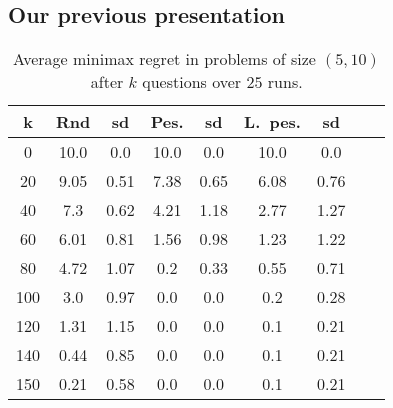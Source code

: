 \documentclass[sigconf, anonymous]{aamas}
\begin{document}
\subsection{Our previous presentation}
\begin{table}
	\begin{center}
		\begin{tabular}{S[table-figures-integer=3, table-number-alignment = right, table-figures-decimal=0]S[table-number-alignment = right]@{ ± }S[table-number-alignment = left]S[table-number-alignment = right]@{ ± }S[table-number-alignment = left]S[table-number-alignment = right]@{ ± }S[table-number-alignment = left]S[table-number-alignment = right]@{ ± }S[table-number-alignment = left]}
			\toprule
			{k} & {Rnd} & {sd} & {Pes.} & {sd} & {L.\ pes.} & {sd} \\
			 & 10.0 & 0.0 & 10.0 & 0.0 & 10.0 & 0.0\\
			20 & 9.05 & 0.51 & 7.38 & 0.65 & 6.08 & 0.76\\
			40 & 7.3 & 0.62 & 4.21 & 1.18 & 2.77 & 1.27\\
			60 & 6.01 & 0.81 & 1.56 &0.98 & 1.23 & 1.22\\
			80 & 4.72 & 1.07 & 0.2 & 0.33 & 0.55 & 0.71\\
			100 & 3.0 & 0.97 & 0.0 &  0.0 & 0.2 & 0.28\\
			120 & 1.31 & 1.15 & 0.0 & 0.0 & 0.1 & 0.21\\
			140 & 0.44 & 0.85 & 0.0 & 0.0 & 0.1 & 0.21\\
			150 & 0.21 & 0.58 & 0.0 & 0.0 & 0.1 & 0.21\\
			\bottomrule
		\end{tabular}
	\end{center}
	\caption{Average minimax regret in problems of size $(5, 10)$ after $k$ questions over $25$ runs.}
	\label{fig:55}
\end{table}
\end{document}
